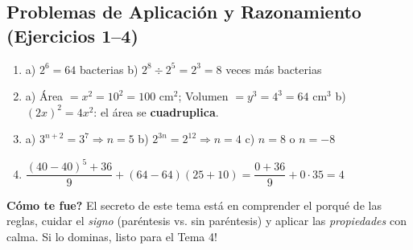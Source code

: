 \documentclass[12pt, letterpaper]{article}
\begin{document}
  \subsection*{Problemas de Aplicación y Razonamiento (Ejercicios 1--4)}

  \begin{enumerate}[leftmargin=*, label=\textbf{\arabic*.}]
    \item a) $2^{6} = 64$ bacterias \quad b) $2^{8} \div 2^{5} = 2^{3} = 8$ veces más bacterias
    \item a) Área $= x^{2} = 10^{2} = 100$ cm$^{2}$; Volumen $= y^{3} = 4^{3} = 64$ cm$^{3}$ \quad b) $(2x)^{2} = 4x^{2}$: el área se \textbf{cuadruplica}.
    \item a) $3^{n+2} = 3^{7} \Rightarrow n = 5$ \quad b) $2^{3n} = 2^{12} \Rightarrow n = 4$ \quad c) $n = 8$ o $n = -8$
    \item $\dfrac{(40 - 40)^{5} + 36}{9} + (64 - 64)(25 + 10) = \dfrac{0 + 36}{9} + 0 \cdot 35 = 4$
  \end{enumerate}

  \vspace{10pt}
  \begin{cuadrosolucion}
    \textbf{\textquestiondown Cómo te fue?} El secreto de este tema está en comprender el porqué de las reglas, cuidar el \emph{signo} (paréntesis vs. sin paréntesis) y aplicar las \emph{propiedades} con calma. Si lo dominas, \textquestiondown listo para el Tema 4!
  \end{cuadrosolucion}

\fi
\end{document}
